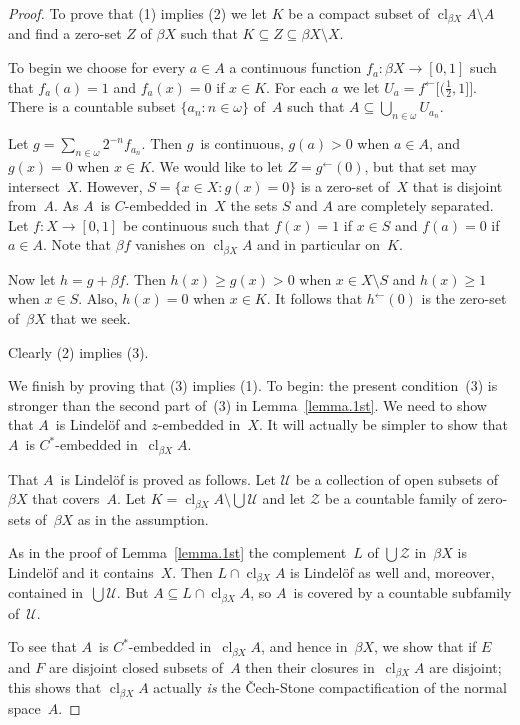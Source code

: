 \documentclass[10pt,a4paper]{amsart}
\newcommand\calU{\mathcal{U}}
\newcommand\calZ{\mathcal{Z}}
\newcommand\clbeta[1][X]{\cl_{\beta #1}}
\newcommand\cl{\operatorname{cl}}
\newcommand\preim{^\gets}
\begin{document}
\begin{proof}
To prove that (1) implies (2) we let $K$ be a compact subset 
of $\clbeta A\setminus A$ and find a zero-set $Z$ of $\beta X$ such 
that $K\subseteq Z\subseteq\beta X\setminus X$.

To begin we choose for every $a\in A$ a continuous function 
$f_a:\beta X\to[0,1]$ such that $f_a(a)=1$ and $f_a(x)=0$ if $x\in K$.
For each $a$ we let $U_a=f\preim\bigl[(\frac12,1]\bigr]$.
There is a countable subset $\{a_n:n\in\omega\}$ of~$A$ such 
that $A\subseteq\bigcup_{n\in\omega}U_{a_n}$.

Let $g=\sum_{n\in\omega}2^{-n}f_{a_n}$.
Then $g$~is continuous, $g(a)>0$ when $a\in A$, and $g(x)=0$ when $x\in K$.
We would like to let $Z=g\preim(0)$, but that set may intersect~$X$.
However, $S=\{x\in X:g(x)=0\}$ is a zero-set of~$X$ that is disjoint from~$A$.
As $A$~is $C$-embedded in~$X$ the sets $S$ and $A$ are completely separated.
Let $f:X\to[0,1]$ be continuous such that $f(x)=1$ if $x\in S$ and $f(a)=0$
if $a\in A$.
Note that $\beta f$ vanishes on $\clbeta A$ and in particular on~$K$.

Now let $h=g+\beta f$.
Then $h(x)\ge g(x)>0$ when $x\in X\setminus S$ and
$h(x)\ge1$ when $x\in S$.
Also, $h(x)=0$ when $x\in K$.
It follows that $h\preim(0)$ is the zero-set of~$\beta X$ that we seek.

\medskip
Clearly (2) implies (3).

\medskip
We finish by proving that (3) implies (1).   
To begin: the present condition~(3) is stronger than the second part of~(3)
in Lemma~\ref{lemma.1st}.
We need to show that $A$~is Lindel\"of and $z$-embedded in~$X$.
It will actually be simpler to show that $A$~is $C^*$-embedded in~$\clbeta A$.

\smallskip
That $A$~is Lindel\"of is proved as follows.
Let $\calU$ be a collection of open subsets of~$\beta X$ that covers~$A$.
Let $K=\clbeta A\setminus\bigcup\calU$ and let $\calZ$ be a countable
family of zero-sets of~$\beta X$ as in the assumption.

As in the proof of Lemma~\ref{lemma.1st} the complement~$L$ of
$\bigcup\calZ$ in~$\beta X$ is Lindel\"of and it contains~$X$.
Then $L\cap\clbeta A$ is Lindel\"of as well and, moreover,
contained in~$\bigcup\calU$.
But $A\subseteq L\cap\clbeta A$, so $A$~is covered by a countable
subfamily of~$\calU$.

\smallskip
To see that $A$~is $C^*$-embedded in~$\clbeta A$, and hence in~$\beta X$,
we show that if $E$ and $F$ are disjoint closed subsets of~$A$ then their 
closures in~$\clbeta A$ are disjoint; this shows that $\clbeta A$ actually
\emph{is} the \v{C}ech-Stone compactification of the normal space~$A$.


\end{proof}
\end{document}
